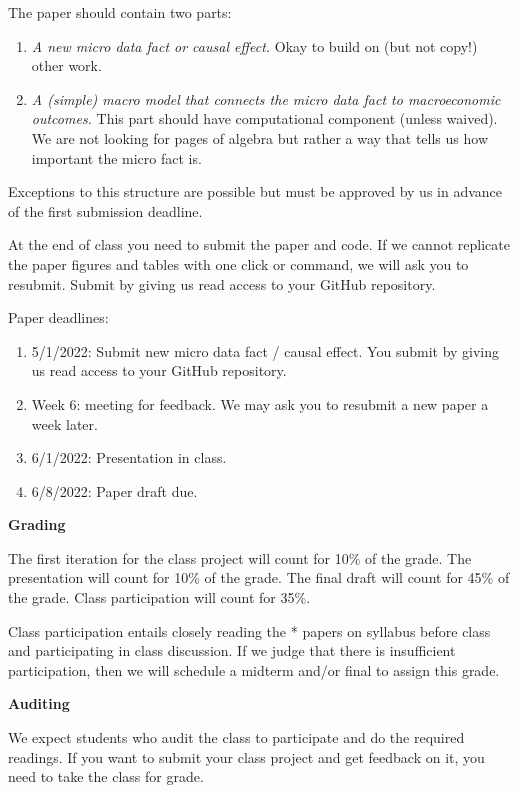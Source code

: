 \documentclass [12pt]{article}
\begin{document}
The paper should contain two parts:
\begin{enumerate}
	\item \emph{A new micro data fact or causal effect.} Okay to build on (but not copy!) other work.
	\item \emph{A (simple) macro model that connects the micro data fact to macroeconomic outcomes.}  This part should have computational component (unless waived). We are not looking for pages of algebra but rather a way that tells us how important the micro fact is.
\end{enumerate}
Exceptions to this structure are possible but must be approved by us in advance of the first submission deadline.

At the end of class you need to submit the paper and code. If we cannot replicate the paper figures and tables with one click or command, we will ask you to resubmit. Submit by giving us read access to your GitHub repository.

Paper deadlines:
\begin{enumerate}
	\item 5/1/2022: Submit new micro data fact / causal effect.  You submit by giving us read access to your GitHub repository.
	\item Week 6: meeting for feedback. We may ask you to resubmit a new paper a week later.
	\item 6/1/2022: Presentation in class.
	\item 6/8/2022: Paper draft due.
\end{enumerate}


\noindent  \textbf{Grading}

\noindent The first iteration for the class project will count for 10\% of the grade. The presentation will count for 10\% of the grade. The final draft will count for 45\% of the grade. Class participation will count for 35\%.

Class participation entails closely reading the * papers on syllabus before class and participating in class discussion. If we judge that there is insufficient participation, then we will schedule a midterm and/or final to assign this grade.






\noindent  \textbf{Auditing}

\noindent We expect students who audit the class to participate and do the required readings. If you want to submit your class project and get feedback on it, you need to take the class for grade.
\end{document}
